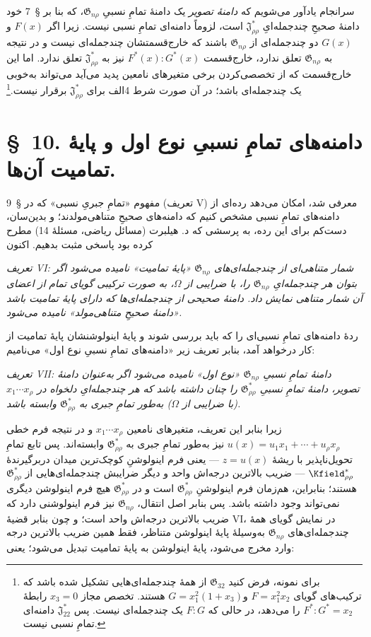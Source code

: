 \documentclass[11pt]{article}
\newcommand{\srcLTR}[1]{\relax\ifmmode\text{\mbox{\babelsublr{\foreignlanguage{english}{#1}}}}\else\babelsublr{\foreignlanguage{english}{#1}}\fi}
\newcommand{\srcfn}[2]{\begingroup\renewcommand{\thefootnote}{\srcLTR{#1}}\footnote{#2}\addtocounter{footnote}{-1}\endgroup}
\providecommand{\Jdom}{\mathfrak{J}}
\providecommand{\Gdom}{\mathfrak{G}}
\begin{document}
سرانجام یادآور می‌شویم که \emph{دامنهٔ تصویر} یک دامنهٔ تمامِ نسبیِ $\Gdom_{n\rho}$، که بنا بر \S\ 7 خود دامنهٔ صحیحِ چندجمله‌ایِ $\Jdom^*_{\rho\rho}$ است، لزوماً دامنه‌ای تمامِ نسبی نیست. زیرا اگر $F(x)$ و$G(x)$ دو چندجمله‌ای از $\Gdom_{n\rho}$ باشند که خارج‌قسمتشان چندجمله‌ای نیست و در نتیجه به $\Gdom_{n\rho}$ تعلق ندارد، خارج‌قسمت $F^*(x):G^*(x)$ نیز به $\Jdom^*_{\rho\rho}$ تعلق ندارد. اما این خارج‌قسمت که از تخصصی‌کردن برخی متغیرهای نامعین پدید می‌آید می‌تواند به‌خوبی یک چندجمله‌ای باشد؛ در آن صورت شرط 4الف برای $\Jdom^*_{\rho\rho}$ برقرار نیست.\srcfn{**)}{برای نمونه، فرض کنید $\Gdom_{32}$ از همهٔ چندجمله‌ای‌هایی تشکیل شده باشد که ترکیب‌های گویای $F=x_1^2x_2$ و$G=x_1^2(1+x_3)$ هستند. تخصص مجاز $x_3=0$ رابطهٔ $F^*:G^*=x_2$ را می‌دهد، در حالی که $F:G$ یک چندجمله‌ای نیست. پس $\Jdom^*_{22}$ دامنه‌ای تمامِ نسبی نیست.}

\section*{\S\ 10. دامنه‌های تمامِ نسبیِ نوع اول و پایهٔ تمامیت آن‌ها.}

مفهوم «تمامِ جبریِ نسبی» که در \S\ 9 (تعریف V) معرفی شد، امکان می‌دهد رده‌ای از دامنه‌های تمامِ نسبی مشخص کنیم که دامنه‌های صحیحِ متناهی‌مولدند؛ و بدین‌سان، دست‌کم برای این رده، به پرسشی که د. هیلبرت (مسائل ریاضی، مسئلهٔ 14) مطرح کرده بود پاسخی مثبت بدهیم. اکنون

\emph{تعریف VI: شمار متناهی‌ای از چندجمله‌ای‌های $\Gdom_{n\rho}$ «پایهٔ تمامیت» نامیده می‌شود اگر بتوان هر چندجمله‌ایِ $\Gdom_{n\rho}$ را، با ضرایبی از $\Omega$، به صورت ترکیبی گویای تمام از اعضای آن شمار متناهی نمایش داد. دامنهٔ صحیحی از چندجمله‌ای‌ها که دارای پایهٔ تمامیت باشد «دامنهٔ صحیحِ متناهی‌مولد» نامیده می‌شود.}

ردهٔ دامنه‌های تمامِ نسبی‌ای را که باید بررسی شوند و پایهٔ اینولوشنشان پایهٔ تمامیت از کار درخواهد آمد، بنابر تعریف زیر «دامنه‌های تمامِ نسبیِ نوع اول» می‌نامیم:

\emph{تعریف VII: دامنهٔ تمامِ نسبیِ $\Gdom_{n\rho}$ «نوع اول» نامیده می‌شود اگر به‌عنوان دامنهٔ تصویر، دامنهٔ تمامِ نسبیِ $\Gdom^*_{\rho\rho}$ را چنان داشته باشد که هر چندجمله‌ایِ دلخواه در $x_1\cdots x_\rho$ (با ضرایبی از $\Omega$) به‌طور تمامِ جبری به $\Gdom^*_{\rho\rho}$ وابسته باشد.}

زیرا بنابر این تعریف، متغیرهای نامعین $x_1\cdots x_\rho$ و در نتیجه فرم خطی $u(x)=u_1x_1+\cdots+u_\rho x_\rho$ نیز به‌طور تمامِ جبری به $\Gdom^*_{\rho\rho}$ وابسته‌اند. پس تابع تمامِ تحویل‌ناپذیر با ریشهٔ $z=u(x)$ --- یعنی فرم اینولوشنِ کوچک‌ترین میدان دربرگیرندهٔ $\Kfield^*_{\rho\rho}$ --- ضریب بالاترین درجه‌اش واحد و دیگر ضرایبش چندجمله‌ای‌هایی از $\Gdom^*_{\rho\rho}$ هستند؛ بنابراین، هم‌زمان فرم اینولوشنِ $\Gdom^*_{\rho\rho}$ است و در $\Gdom^*_{\rho\rho}$ هیچ فرم اینولوشن دیگری نمی‌تواند وجود داشته باشد. پس بنابر اصل انتقال، $\Gdom_{n\rho}$ نیز فرم اینولوشنی دارد که ضریب بالاترین درجه‌اش واحد است؛ و چون بنابر قضیهٔ VI، در نمایش گویای همهٔ چندجمله‌ای‌های $\Gdom_{n\rho}$ به‌وسیلهٔ پایهٔ اینولوشن متناظر، فقط همین ضریب بالاترین درجه وارد مخرج می‌شود، پایهٔ اینولوشن به پایهٔ تمامیت تبدیل می‌شود؛ یعنی:
\end{document}

